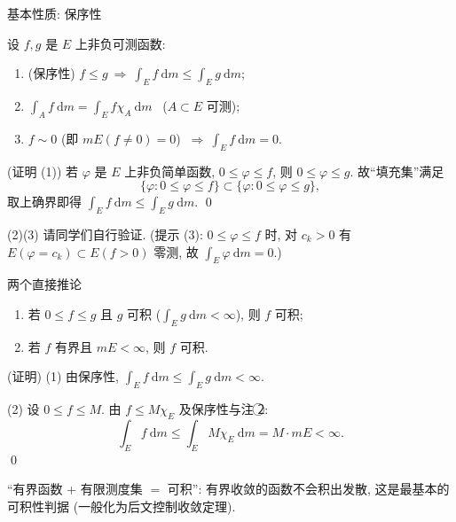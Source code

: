 
\begin{frame}{基本性质: 保序性}

\begin{prop}
设 $f, g$ 是 $E$ 上非负可测函数:
\begin{enumerate}
\item (保序性) $f \leqslant g \ \Longrightarrow\ \int_E f ~ \mathrm{d} m \leqslant \int_E g ~ \mathrm{d} m$;
\item $\displaystyle \int_A f ~ \mathrm{d} m = \int_E f \chi_A ~ \mathrm{d} m$ \ ($A \subset E$ 可测);
\item $f \sim 0$ (即 $mE(f \neq 0) = 0$) $\ \Longrightarrow\ \int_E f ~ \mathrm{d} m = 0$.
\end{enumerate}
\end{prop}

\startproof[bg=yellow, fg=red](证明 (1))
若 $\varphi$ 是 $E$ 上非负简单函数, $0 \leqslant \varphi \leqslant f$, 则 $0 \leqslant \varphi \leqslant g$.
故``填充集''满足
\[
\{ \varphi : 0 \leqslant \varphi \leqslant f \}
\subset \{ \varphi : 0 \leqslant \varphi \leqslant g \},
\]
取上确界即得 $\int_E f ~ \mathrm{d} m \leqslant \int_E g ~ \mathrm{d} m$. \qed

\pause

\begin{attnblock}
(2)(3) 请同学们自行验证.
(提示 (3): $0 \leqslant \varphi \leqslant f$ 时, 对 $c_k > 0$ 有
$E(\varphi = c_k) \subset E(f > 0)$ 零测, 故 $\int_E \varphi ~ \mathrm{d} m = 0$.)
\end{attnblock}

\end{frame}


\begin{frame}{两个直接推论}

\begin{cor}
\begin{enumerate}
\item 若 $0 \leqslant f \leqslant g$ 且 $g$ 可积 ($\int_E g ~ \mathrm{d} m < \infty$), 则 $f$ 可积;
\item 若 $f$ 有界且 $mE < \infty$, 则 $f$ 可积.
\end{enumerate}
\end{cor}

\startproof[bg=yellow, fg=red](证明)
(1) 由保序性, $\int_E f ~ \mathrm{d} m \leqslant \int_E g ~ \mathrm{d} m < \infty$.

\pause

(2) 设 $0 \leqslant f \leqslant M$. 由 $f \leqslant M \chi_E$ 及保序性与注 \textcircled{2}:
\[
\int_E f ~ \mathrm{d} m \leqslant \int_E M \chi_E ~ \mathrm{d} m = M \cdot mE < \infty .
\]
\qed

\pause

\begin{attnblock}
``有界函数 + 有限测度集 $=$ 可积'':
有界收敛的函数不会积出发散, 这是最基本的可积性判据 (一般化为后文控制收敛定理).
\end{attnblock}

\end{frame}

